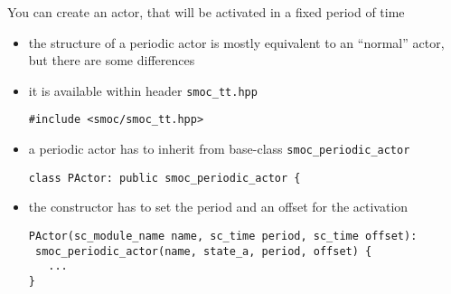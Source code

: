 \begin{frame}[fragile=singleslide]
You can create an actor, that will be activated in a fixed period of time
\begin{itemize}
\item the structure of a periodic actor is mostly equivalent to an ``normal'' actor,
 but there are some differences
\item it is available within header \lstinline{smoc_tt.hpp}
\begin{lstlisting}
#include <smoc/smoc_tt.hpp>
\end{lstlisting}

\item a periodic actor has to inherit from base-class \lstinline{smoc_periodic_actor}
\begin{lstlisting}
class PActor: public smoc_periodic_actor {
\end{lstlisting}
\item the constructor has to set the period and an offset for the activation
\begin{lstlisting}
PActor(sc_module_name name, sc_time period, sc_time offset):
 smoc_periodic_actor(name, state_a, period, offset) {
   ...
}
\end{lstlisting}
\end{itemize}
\end{frame}




